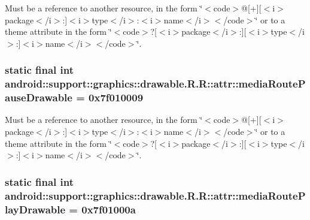 Must be a reference to another resource, in the form \char`\"{}$<$code$>$@\mbox{[}+\mbox{]}\mbox{[}$<$i$>$package$<$/i$>$:\mbox{]}$<$i$>$type$<$/i$>$:$<$i$>$name$<$/i$>$$<$/code$>$\char`\"{} or to a theme attribute in the form \char`\"{}$<$code$>$?\mbox{[}$<$i$>$package$<$/i$>$:\mbox{]}\mbox{[}$<$i$>$type$<$/i$>$:\mbox{]}$<$i$>$name$<$/i$>$$<$/code$>$\char`\"{}. \hypertarget{classandroid_1_1support_1_1graphics_1_1drawable_1_1_r_1_1attr_8a0e7e6933fa5fb7a0696551ef007d09}{
\subsubsection[{mediaRoutePauseDrawable}]{\setlength{\rightskip}{0pt plus 5cm}static final int android::support::graphics::drawable.R.R::attr::mediaRoutePauseDrawable = 0x7f010009}}
\label{classandroid_1_1support_1_1graphics_1_1drawable_1_1_r_1_1attr_8a0e7e6933fa5fb7a0696551ef007d09}


Must be a reference to another resource, in the form \char`\"{}$<$code$>$@\mbox{[}+\mbox{]}\mbox{[}$<$i$>$package$<$/i$>$:\mbox{]}$<$i$>$type$<$/i$>$:$<$i$>$name$<$/i$>$$<$/code$>$\char`\"{} or to a theme attribute in the form \char`\"{}$<$code$>$?\mbox{[}$<$i$>$package$<$/i$>$:\mbox{]}\mbox{[}$<$i$>$type$<$/i$>$:\mbox{]}$<$i$>$name$<$/i$>$$<$/code$>$\char`\"{}. \hypertarget{classandroid_1_1support_1_1graphics_1_1drawable_1_1_r_1_1attr_81e81867b0dd9f9efe658337ac6cc8e0}{
\subsubsection[{mediaRoutePlayDrawable}]{\setlength{\rightskip}{0pt plus 5cm}static final int android::support::graphics::drawable.R.R::attr::mediaRoutePlayDrawable = 0x7f01000a}}
\label{classandroid_1_1support_1_1graphics_1_1drawable_1_1_r_1_1attr_81e81867b0dd9f9efe658337ac6cc8e0}


